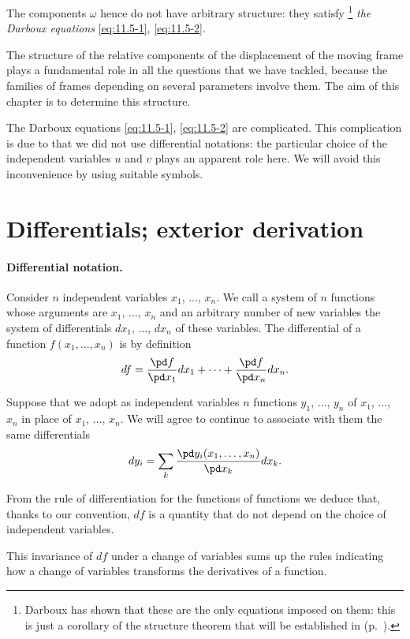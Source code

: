 The components $\omega$ hence do not have arbitrary structure: they satisfy \footnote{Darboux has shown that these are the only equations imposed on them: this is just a corollary of the structure theorem that will be established in  (p.~\pageref{sec:163}).} \emph{the Darboux equations} \eqref{eq:11.5-1}, \eqref{eq:11.5-2}.

The structure of the relative components of the displacement of the moving frame plays a fundamental role in all the questions that we have tackled, because the families of frames depending on several parameters involve them. The aim of this chapter is to determine this structure.

The Darboux equations \eqref{eq:11.5-1}, \eqref{eq:11.5-2} are complicated. This complication is due to that we did not use differential notations: the particular choice of the independent variables $u$ and $v$ plays an apparent role here. We will avoid this inconvenience by using suitable symbols.

\section{Differentials; exterior derivation}
\label{sec:diff-exter-deriv}

\paragraph{Differential notation.}
\label{sec:153}
Consider $n$ independent variables $x_{1}$, $\dots$, $x_{n}$. We call a system of $n$ functions whose arguments are $x_{1}$, $\dots$, $x_{n}$ and an arbitrary number of new variables the system of differentials $dx_{1}$, $\dots$, $dx_{n}$ of these variables. The differential of a function $f(x_{1}, \dots,x_{n})$ is by definition
\[
df=\frac{\pd f}{\pd x_{1}}dx_{1}+\dots+\frac{\pd f}{\pd x_{n}}dx_{n}.
\]

Suppose that we adopt as independent variables $n$ functions $y_{1}$, $\dots$, $y_{n}$ of $x_{1}$, $\dots$, $x_{n}$ in place of $x_{1}$, $\dots$, $x_{n}$. We will agree to continue to associate with them the same differentials
\[
dy_{i}=\sum_{k}\frac{\pd y_{i}(x_{1},\dots,x_{n})}{\pd x_{k}}dx_{k}.
\]

From the rule of differentiation for the functions of functions we deduce that, thanks to our convention, $df$ is a quantity that do not depend on the choice of independent variables.

This invariance of $df$ under a change of variables sums up the rules indicating how a change of variables transforms the derivatives of a function.

